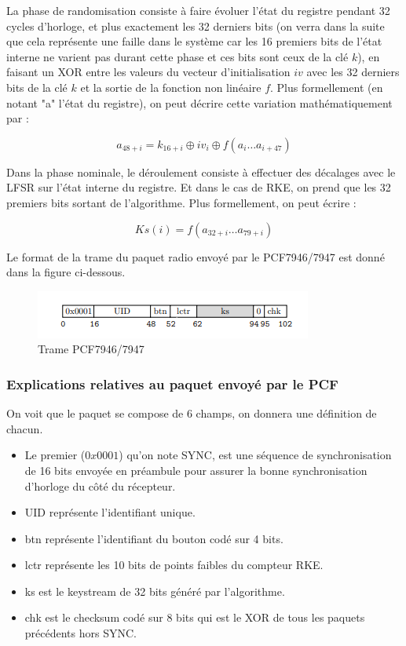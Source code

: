 \documentclass{template}
\begin{document}
La phase de randomisation consiste à faire évoluer l'état du registre pendant 32 cycles d'horloge, et plus exactement les 32 derniers bits (on verra dans la suite que cela représente une faille dans le système car les 16 premiers bits de l'état interne ne varient pas durant cette phase et ces bits sont ceux de la clé \(k\)), en faisant un XOR entre les valeurs du vecteur d'initialisation \(iv\) avec les 32 derniers bits de la clé \(k\) et la sortie de la fonction non linéaire \(f\). Plus formellement (en notant "a" l'état du registre), on peut décrire cette variation mathématiquement par :

\[a_{48+i}=k_{16+i} \oplus iv_i \oplus f(a_i \ldots a_{i+47})\]

Dans la phase nominale, le déroulement consiste à effectuer des décalages avec le LFSR sur l'état interne du registre. Et dans le cas de RKE, on prend que les 32 premiers bits sortant de l'algorithme. Plus formellement, on peut écrire :

\[Ks(i)=f(a_{32+i} \ldots a_{79+i})\]

Le format de la trame du paquet radio envoyé par le PCF7946/7947 est donné dans la figure ci-dessous.

\begin{figure}
    \centering
    \includegraphics[width=\textwidth]{tempsnip.png}
    \caption{Trame PCF7946/7947}
    \label{fig:image}
\end{figure}

\subsubsection{Explications relatives au paquet envoyé par le PCF}
On voit que le paquet se compose de 6 champs, on donnera une définition de chacun.

\begin{itemize}
    \item Le premier (\(0x0001\)) qu'on note SYNC, est une séquence de synchronisation de 16 bits envoyée en préambule pour assurer la bonne synchronisation d'horloge du côté du récepteur.
    \item UID représente l'identifiant unique.
    \item btn représente l'identifiant du bouton codé sur 4 bits.
    \item lctr représente les 10 bits de points faibles du compteur RKE.
    \item ks est le keystream de 32 bits généré par l'algorithme.
    \item chk est le checksum codé sur 8 bits qui est le XOR de tous les paquets précédents hors SYNC.
\end{itemize}
\end{document}
